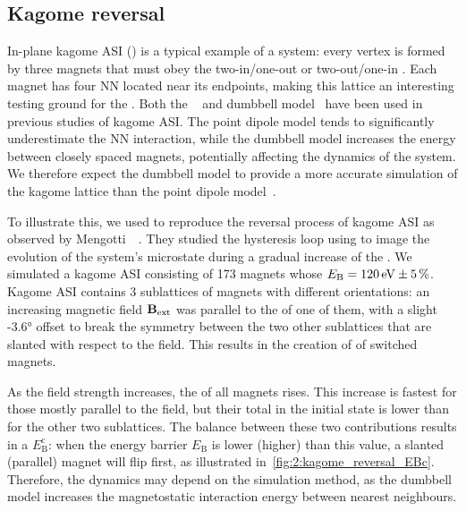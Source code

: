 \subsection{Kagome reversal}
In-plane kagome ASI () is a typical example of a  system: every vertex is formed by three magnets that must obey the two-in/one-out or two-out/one-in .
Each magnet has four NN located near its endpoints, making this lattice an interesting testing ground for the .
Both the ~\cite{Chern2011} and dumbbell model~\cite{Moller2009} have been used in previous studies of kagome ASI.
The point dipole model tends to significantly underestimate the NN interaction, while the dumbbell model increases the  energy between closely spaced magnets, potentially affecting the dynamics of the system.
We therefore expect the dumbbell model to provide a more accurate simulation of the kagome lattice than the point dipole model~\cite{flatspin,mengotti2011kagome}. \par
To illustrate this, we used \hotspice to reproduce the reversal process of kagome ASI as observed by Mengotti~\etal~\cite{mengotti2011kagome}.
They studied the hysteresis loop using  to image the evolution of the system's microstate during a gradual increase of the .
We simulated a kagome ASI consisting of 173 magnets whose  $E_\mathrm{B} = \SI{120}{\electronvolt} \pm \SI{5}{\percent}$.
Kagome ASI contains 3 sublattices of magnets with different orientations: an increasing magnetic field $\boldsymbol{\mathbf{B}}_\mathrm{ext}$ was parallel to the  of one of them, with a slight \ang{-3.6} offset to break the symmetry between the two other sublattices that are slanted with respect to the field.
This results in the creation of  of switched magnets. \par
As the field strength increases, the  of all magnets rises.
This increase is fastest for those mostly parallel to the field, but their total  in the initial state is lower than for the other two sublattices.
The balance between these two contributions results in a  $E_\mathrm{B}^\mathrm{c}$: when the energy barrier $E_\mathrm{B}$ is lower (higher) than this value, a slanted (parallel) magnet will flip first, as illustrated in~\cref{fig:2:kagome_reversal_EBc}.
Therefore, the dynamics may depend on the simulation method, as the dumbbell model increases the magnetostatic interaction energy between nearest neighbours.

